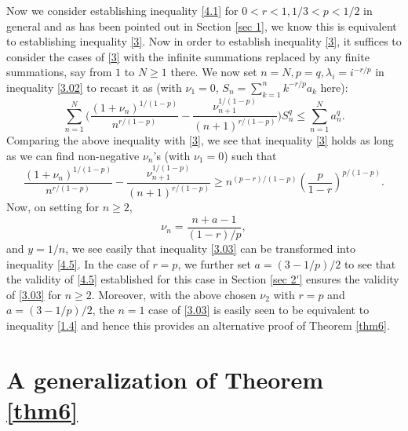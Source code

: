 \documentclass[11pt]{amsart}
\numberwithin{equation}{section}
\theoremstyle{definition}
\theoremstyle{remark}
\begin{document}
    Now we consider establishing inequality \eqref{4.1} for $0<r<1, 1/3<p<1/2$ in general
    and as has been pointed out in Section \ref{sec 1}, we know
    this is equivalent to establishing inequality \eqref{3}.
    Now in order to establish inequality \eqref{3}, it suffices
    to consider the cases of \eqref{3} with the infinite summations replaced by any finite summations,
    say from $1$ to $N \geq 1$ there.
    We now set $n=N, p=q, \lambda_i=i^{-r/p}$ in inequality \eqref{3.02}
    to recast it as (with $\nu_1=0$, $S_n=\sum^{n}_{k=1}k^{-r/p}a_k$ here):
\begin{equation*}
    \sum_{n=1}^{N}\Big ( \frac {(1+\nu_n)^{1/(1-p)}}{n^{r/(1-p)}}-
   \frac {\nu^{1/(1-p)}_{n+1}}{(n+1)^{r/(1-p)}} \Big )S_n^{q} \leq \sum_{n=1}^N  a_n^{q}.
\end{equation*}
     Comparing the above inequality with \eqref{3}, we see that inequality \eqref{3} holds as long as we can find
     non-negative $\nu_n$'s (with $\nu_1=0$) such that
\begin{equation}
\label{3.03}
    \frac {(1+\nu_n)^{1/(1-p)}}{n^{r/(1-p)}}-
   \frac {\nu^{1/(1-p)}_{n+1}}{(n+1)^{r/(1-p)}} \geq n^{(p-r)/(1-p)}\left (\frac {p}{1-r}
   \right )^{p/(1-p)}.
\end{equation}
    Now, on setting for $n \geq 2$,
\begin{equation*}
    \nu_n=\frac {n+a-1}{(1-r)/p},
\end{equation*}
    and $y=1/n$, we see easily that inequality \eqref{3.03} can be
    transformed into inequality \eqref{4.5}. In the case of $r=p$, we further set $a=(3-1/p)/2$ to
    see that the validity of \eqref{4.5} established for this case in Section \ref{sec 2'} ensures the validity
    of \eqref{3.03} for $n \geq 2$. Moreover, with the above chosen
    $\nu_2$ with $r=p$ and $a=(3-1/p)/2$,
    the $n=1$ case of \eqref{3.03} is easily seen to be equivalent
    to inequality \eqref{1.4} and hence this provides an alternative proof of
    Theorem \ref{thm6}.

\section{A generalization of Theorem \ref{thm6}}
\label{sec4} \setcounter{equation}{0}
\end{document}

